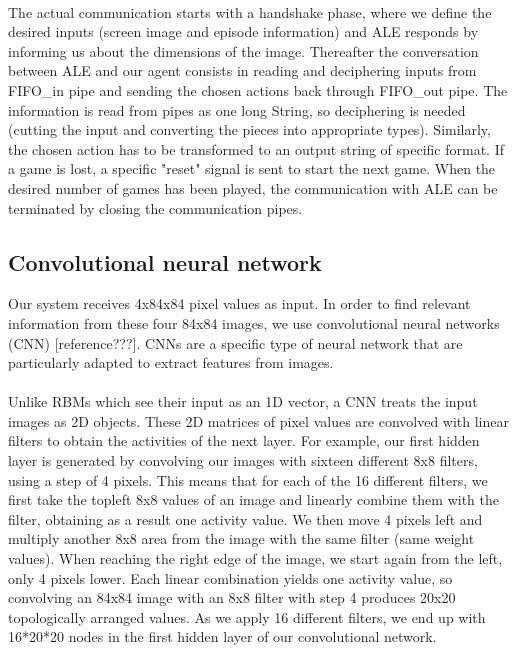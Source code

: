 \documentclass[a4paper,12pt]{article}
\begin{document}
\paragraph{}
The actual communication starts with a handshake phase, where we define the desired inputs (screen image and episode information) and ALE responds by informing us about the dimensions of the image. Thereafter the conversation between ALE and our agent consists in reading and deciphering inputs from FIFO\_in pipe and sending the chosen actions back through FIFO\_out pipe. The information is read from pipes as one long String, so deciphering is needed (cutting the input and converting the pieces into appropriate types). Similarly, the chosen action has to be transformed to an output string of specific format. If a game is lost, a specific "reset" signal is sent to start the next game. When the desired number of games has been played, the communication with ALE can be terminated by closing the communication pipes. 



\subsection{Convolutional neural network}
Our system receives 4x84x84 pixel values as input. In order to find relevant information from these four 84x84 images, we use convolutional neural networks (CNN) [reference???]. CNNs are a specific type of neural network that are particularly adapted to extract features from images.
\paragraph{}
Unlike RBMs which see their input as an 1D vector, a CNN treats the input images as 2D objects. These 2D matrices of pixel values are convolved with linear filters to obtain the activities of the next layer. For example, our first hidden layer is generated by convolving our images with sixteen different 8x8 filters, using a step of 4 pixels. This means that for each of the 16 different filters, we first take the topleft 8x8 values of an image and linearly combine them with the filter, obtaining as a result one activity value. We then move 4 pixels left and multiply another 8x8 area from the image with the same filter (same weight values). When reaching the right edge of the image, we start again from the left, only 4 pixels lower. Each linear combination yields one activity value, so convolving an 84x84 image with an 8x8 filter with step 4 produces 20x20 topologically arranged values. As we apply 16 different filters, we end up with 16*20*20 nodes in the first hidden layer of our convolutional network.
\end{document}
